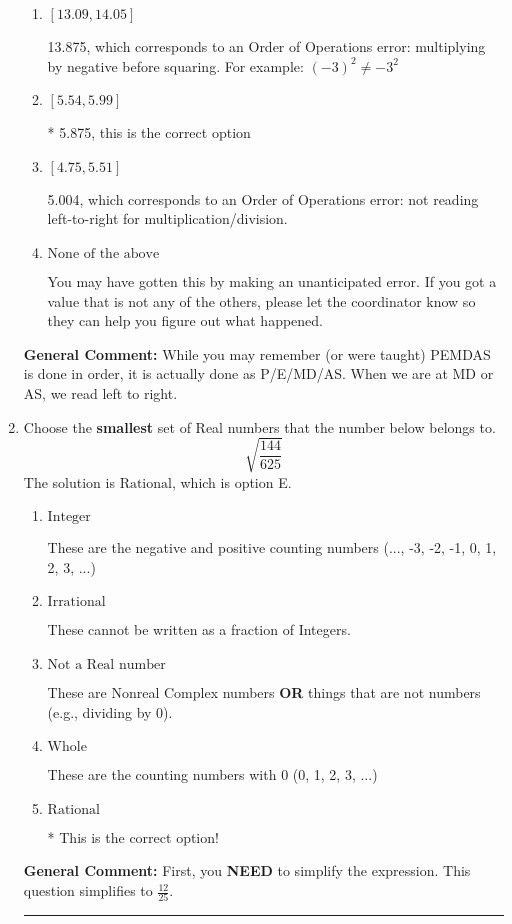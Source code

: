 \documentclass{extbook}[14pt]
\newcommand{\litem}[1]{\item #1

\rule{\textwidth}{0.4pt}}
\begin{document}
\begin{enumerate}
{\begin{enumerate}[label=\Alph*.]
 13.004, which corresponds to two Order of Operations errors.
\item \( [13.09, 14.05] \)

 13.875, which corresponds to an Order of Operations error: multiplying by negative before squaring. For example: $(-3)^2 \neq -3^2$
\item \( [5.54, 5.99] \)

* 5.875, this is the correct option
\item \( [4.75, 5.51] \)

 5.004, which corresponds to an Order of Operations error: not reading left-to-right for multiplication/division.
\item \( \text{None of the above} \)

 You may have gotten this by making an unanticipated error. If you got a value that is not any of the others, please let the coordinator know so they can help you figure out what happened.
\end{enumerate}

\textbf{General Comment:} While you may remember (or were taught) PEMDAS is done in order, it is actually done as P/E/MD/AS. When we are at MD or AS, we read left to right.
}
\litem{
Choose the \textbf{smallest} set of Real numbers that the number below belongs to.
\[ \sqrt{\frac{144}{625}} \]The solution is \( \text{Rational} \), which is option E.\begin{enumerate}[label=\Alph*.]
\item \( \text{Integer} \)

These are the negative and positive counting numbers (..., -3, -2, -1, 0, 1, 2, 3, ...)
\item \( \text{Irrational} \)

These cannot be written as a fraction of Integers.
\item \( \text{Not a Real number} \)

These are Nonreal Complex numbers \textbf{OR} things that are not numbers (e.g., dividing by 0).
\item \( \text{Whole} \)

These are the counting numbers with 0 (0, 1, 2, 3, ...)
\item \( \text{Rational} \)

* This is the correct option!
\end{enumerate}

\textbf{General Comment:} First, you \textbf{NEED} to simplify the expression. This question simplifies to $\frac{12}{25}$. 
 
}
\end{enumerate}
\end{document}
